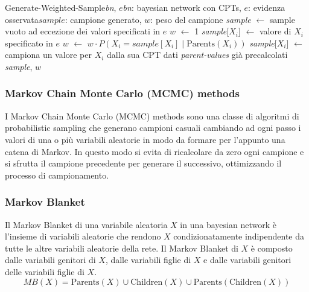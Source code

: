 \begin{algo}{Generate-Weighted-Sample}{\textit{bn}, $e$}{\textit{bn}: bayesian network con CPTs, $e$: evidenza osservata}{$\textit{sample}$: campione generato, $w$: peso del campione}
	\State \textit{sample} $\leftarrow$ sample vuoto ad eccezione dei valori specificati in $e$
	\State $w$ $\leftarrow$ 1 
			\State \textit{sample}[$X_i$] $\leftarrow$ valore di $X_i$ specificato in $e$ 
			\State $w$ $\leftarrow$ $w \cdot P(X_i = \textit{sample}[X_i] \mid \text{Parents}(X_i))$ 
		\Else
			\State \textit{sample}[$X_i$] $\leftarrow$ campiona un valore per $X_i$ dalla sua CPT dati \textit{parent-values} già precalcolati
		\EndIf
	\EndFor
	\State \Return \textit{sample}, $w$
\end{algo}

\newpage

\subsubsection*{Markov Chain Monte Carlo (MCMC) methods}
I Markov Chain Monte Carlo (MCMC) methods sono una classe di algoritmi di probabilistic sampling che generano campioni casuali
cambiando ad ogni passo i valori di una o più variabili aleatorie in modo da formare per l'appunto una catena di Markov.
In questo modo si evita di ricalcolare da zero ogni campione e si sfrutta il campione precedente per generare il successivo,
ottimizzando il processo di campionamento.

\subsubsection*{Markov Blanket}
Il Markov Blanket di una variabile aleatoria \(X\) in una bayesian network è l'insieme di variabili aleatorie che rendono
\(X\) condizionatamente indipendente da tutte le altre variabili aleatorie della rete. Il Markov Blanket di \(X\) è composto
dalle variabili genitori di \(X\), dalle variabili figlie di \(X\) e dalle variabili genitori delle variabili figlie di \(X\).
\[MB(X) = \text{Parents}(X) \cup \text{Children}(X) \cup \text{Parents}(\text{Children}(X))\]

